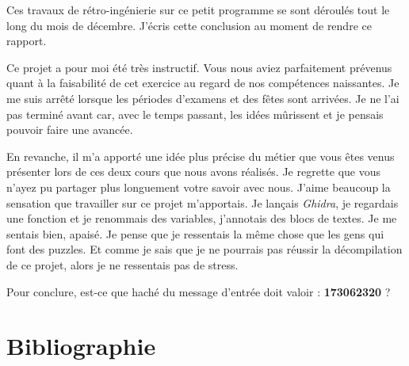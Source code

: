 \documentclass{rapport}
\begin{document}
\hspace{18pt}Ces travaux de rétro-ingénierie sur ce petit programme se sont déroulés tout le long du mois de décembre. J'écris cette conclusion au moment de rendre ce rapport.

\hspace{18pt}Ce projet a pour moi été très instructif. Vous nous aviez parfaitement prévenus quant à la faisabilité de cet exercice au regard de nos compétences naissantes. Je me suis arrêté lorsque les périodes d'examens et des fêtes sont arrivées. Je ne l'ai pas terminé avant car, avec le temps passant, les idées mûrissent et je pensais pouvoir faire une avancée.

\hspace{18pt}En revanche, il m'a apporté une idée plus précise du métier que vous êtes venus présenter lors de ces deux cours que nous avons réalisés. Je regrette que vous n'ayez pu partager plus longuement votre savoir avec nous. J'aime beaucoup la sensation que travailler sur ce projet m'apportais. Je lançais \textit{Ghidra}, je regardais une fonction et je renommais des variables, j'annotais des blocs de textes. Je me sentais bien, apaisé. Je pense que je ressentais la même chose que les gens qui font des puzzles. Et comme je sais que je ne pourrais pas réussir la décompilation de ce projet, alors je ne ressentais pas de stress.

Pour conclure, est-ce que haché du message d'entrée doit valoir : \textbf{173062320} ?

\newpage
\section{Bibliographie}

\printbibliography
 
\end{document}
